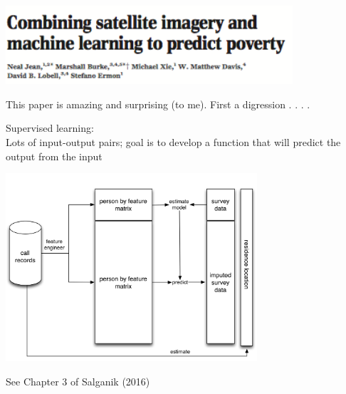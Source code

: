 \documentclass[aspectratio=169]{beamer}
\begin{document}
\begin{frame}

\begin{center}
\includegraphics[width=0.8\textwidth]{figures/jean_combining_2016_title}
\end{center}

\vfill

This paper is amazing and surprising (to me).  First a digression . . . .

\end{frame}
\begin{frame}

Supervised learning:\\
Lots of input-output pairs; goal is to develop a function that will predict the output from the input

\end{frame}
\begin{frame}

\begin{center}
\includegraphics[width=0.7\textwidth]{figures/blumenstock_predicting_2015_schematic_6}
\end{center}
\vfill
See Chapter 3 of Salganik (2016)
\end{frame}
\end{document}
